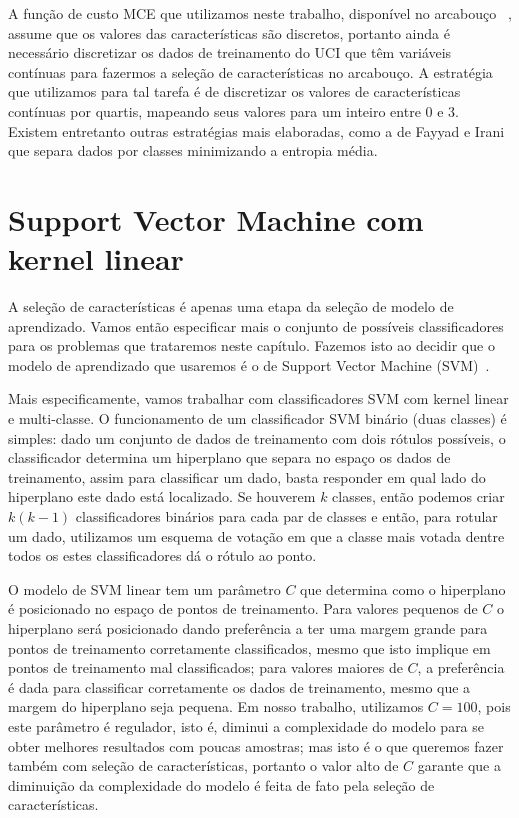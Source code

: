 A função de custo MCE que utilizamos neste trabalho, disponível no
arcabouço ~\cite{Reis+17}, assume que os valores
das características são discretos, portanto ainda é necessário 
discretizar os dados de treinamento do UCI que têm variáveis contínuas 
para fazermos a seleção de características no arcabouço.
A estratégia que utilizamos para tal tarefa é de 
discretizar os valores de características contínuas por quartis, 
mapeando seus valores para um inteiro entre 0 e 3. Existem entretanto 
outras estratégias mais elaboradas, como a de Fayyad e Irani~\cite{FI93}
que separa dados por classes minimizando a entropia média.

\section{Support Vector Machine com kernel linear}
\label{sec:real_instances:svm}
A seleção de características é apenas uma etapa da seleção de modelo
de aprendizado. Vamos então especificar mais o conjunto de possíveis
classificadores para os problemas que trataremos neste capítulo. Fazemos
isto ao decidir que o modelo de aprendizado que usaremos é o de
Support Vector Machine (SVM)~\cite{CL11}.

Mais especificamente, vamos trabalhar com classificadores SVM com kernel
linear e multi-classe. O funcionamento de um classificador SVM binário
(duas classes) é simples: dado um conjunto de dados de treinamento com 
dois rótulos possíveis, o classificador determina um hiperplano que 
separa no espaço os dados de treinamento, assim para classificar um dado, 
basta responder em qual lado do hiperplano este dado está localizado.
Se houverem $k$ classes, então podemos criar $k(k-1)$ classificadores
binários para cada par de classes e então, para rotular um dado,
utilizamos um esquema de votação em que a classe mais votada dentre 
todos os estes classificadores dá o rótulo ao ponto.

O modelo de SVM linear tem um parâmetro $C$ que determina como o 
hiperplano é posicionado no espaço de pontos de treinamento. Para 
valores pequenos de $C$ o hiperplano será posicionado dando preferência
a ter uma margem grande para pontos de treinamento corretamente 
classificados, mesmo que isto implique em pontos de treinamento mal 
classificados; para valores maiores de $C$, a preferência é dada para 
classificar corretamente os dados de treinamento, mesmo que a margem do
hiperplano seja pequena. Em nosso trabalho, utilizamos $C = 100$, pois
este parâmetro é regulador, isto é, diminui a complexidade do modelo
para se obter melhores resultados com poucas amostras; mas isto é o que
queremos fazer também com seleção de características, portanto o valor
alto de $C$ garante que a diminuição da complexidade do modelo é feita
de fato pela seleção de características.

